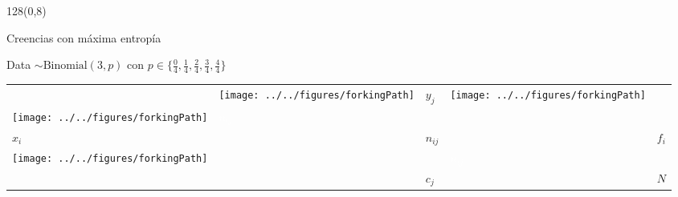 \documentclass[shownotes]{beamer}
\begin{document}
\begin{frame}
\begin{textblock}{128}(0,8)
\begin{center}
  \large Creencias con m\'axima entrop\'ia
\end{center}
\end{textblock}

\vspace{-1.25cm}

Data $\sim \text{Binomial}(3,p)$\vspace{0.1cm} con $p \in \{\frac{0}{4},\frac{1}{4},\frac{2}{4},\frac{3}{4},\frac{4}{4} \}$



\begin{table}[H]
\begin{tabular}{lllll}
                      &  \texttt{[image: ../../figures/forkingPath]}                 &    $y_j$            &       \texttt{[image: ../../figures/forkingPath]}                  &  \\[0.1cm] \cline{2-4}
\multicolumn{1}{l|}{\texttt{[image: ../../figures/forkingPath]}} & \multicolumn{1}{l|}{\textcolor{white}{$n_{ij}$}} & \multicolumn{1}{l|}{} & \multicolumn{1}{l|}{} &  \\[0.1cm] \cline{2-4}
\multicolumn{1}{l|}{$x_i$} & \multicolumn{1}{l|}{} & \multicolumn{1}{l|}{$n_{ij}$} & \multicolumn{1}{l|}{} &  $f_i$ \\[0.1cm] \cline{2-4}
\multicolumn{1}{l|}{\texttt{[image: ../../figures/forkingPath]}} & \multicolumn{1}{l|}{} & \multicolumn{1}{l|}{} & \multicolumn{1}{l|}{\textcolor{white}{$n_{ij}$}} &  \\[0.1cm] \cline{2-4}
&  & ${c_j}$ & & $N$
\end{tabular}
\end{table}






\end{frame}
\end{document}
